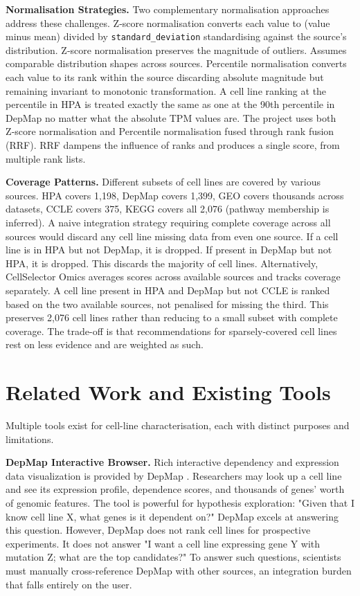 \documentclass[author={Karen Coutinho, Ishaan Bhalla, Aman Raj, Dixit Kaloorani Malarmannan},
                supervisor={Dr. Daniel D'Andrea},
                degree={MSc},
                title={CellSelector Omics: A Multi-Omics Recommendation System for Cell Line Selection},
                subtitle={},
                type={},
                year={2026}]{dissertation}
\begin{document}
{\bf Normalisation Strategies.} Two complementary normalisation approaches address these challenges. Z‑score normalisation converts each value to (value minus mean) divided by \texttt{standard\_deviation} standardising against the source’s distribution. Z‑score normalisation preserves the magnitude of outliers. Assumes comparable distribution shapes across sources. Percentile normalisation converts each value to its rank within the source discarding absolute magnitude but remaining invariant to monotonic transformation. A cell line ranking at the percentile in HPA is treated exactly the same as one at the 90th percentile in DepMap no matter what the absolute TPM values are. The project uses both Z‑score normalisation and Percentile normalisation fused through rank fusion (RRF). RRF dampens the influence of ranks and produces a single score, from multiple rank lists.

{\bf Coverage Patterns.} Different subsets of cell lines are covered by various sources. HPA covers 1,198, DepMap covers 1,399, GEO covers thousands across datasets, CCLE covers 375, KEGG covers all 2,076 (pathway membership is inferred). A naive integration strategy requiring complete coverage across all sources would discard any cell line missing data from even one source. If a cell line is in HPA but not DepMap, it is dropped. If present in DepMap but not HPA, it is dropped. This discards the majority of cell lines. Alternatively, CellSelector Omics averages scores across available sources and tracks coverage separately. A cell line present in HPA and DepMap but not CCLE is ranked based on the two available sources, not penalised for missing the third. This preserves 2,076 cell lines rather than reducing to a small subset with complete coverage. The trade-off is that recommendations for sparsely-covered cell lines rest on less evidence and are weighted as such.

\section{Related Work and Existing Tools}

Multiple tools exist for cell-line characterisation, each with distinct purposes and limitations.

{\bf DepMap Interactive Browser.} Rich interactive dependency and expression data visualization is provided by DepMap \cite{tsherniak2017depmap}. Researchers may look up a cell line and see its expression profile, dependence scores, and thousands of genes' worth of genomic features. The tool is powerful for hypothesis exploration: "Given that I know cell line X, what genes is it dependent on?" DepMap excels at answering this question. However, DepMap does not rank cell lines for prospective experiments. It does not answer "I want a cell line expressing gene Y with mutation Z; what are the top candidates?" To answer such questions, scientists must manually cross-reference DepMap with other sources, an integration burden that falls entirely on the user.
\end{document}

